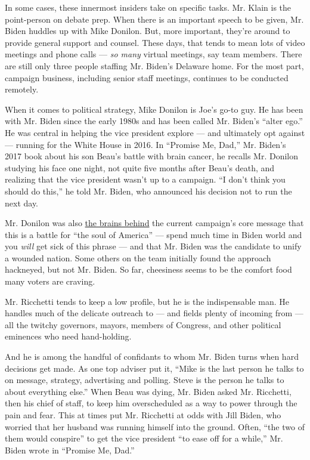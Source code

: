 In some cases, these innermost insiders take on specific tasks. Mr.
Klain is the point-person on debate prep. When there is an important
speech to be given, Mr. Biden huddles up with Mike Donilon. But, more
important, they're around to provide general support and counsel. These
days, that tends to mean lots of video meetings and phone calls ---
\emph{so many} virtual meetings, say team members. There are still only
three people staffing Mr. Biden's Delaware home. For the most part,
campaign business, including senior staff meetings, continues to be
conducted remotely.

When it comes to political strategy, Mike Donilon is Joe's go-to guy. He
has been with Mr. Biden since the early 1980s and has been called Mr.
Biden's ``alter ego.'' He was central in helping the vice president
explore --- and ultimately opt against --- running for the White House
in 2016. In ``Promise Me, Dad,'' Mr. Biden's 2017 book about his son
Beau's battle with brain cancer, he recalls Mr. Donilon studying his
face one night, not quite five months after Beau's death, and realizing
that the vice president wasn't up to a campaign. ``I don't think you
should do this,'' he told Mr. Biden, who announced his decision not to
run the next day.

Mr. Donilon was also
\href{https://www.politico.com/news/magazine/2019/12/19/biden-2020-campaign-president-advisers-087410}{the
brains behind} the current campaign's core message that this is a battle
for ``the soul of America'' --- spend much time in Biden world and you
\emph{will} get sick of this phrase --- and that Mr. Biden was the
candidate to unify a wounded nation. Some others on the team initially
found the approach hackneyed, but not Mr. Biden. So far, cheesiness
seems to be the comfort food many voters are craving.

Mr. Ricchetti tends to keep a low profile, but he is the indispensable
man. He handles much of the delicate outreach to --- and fields plenty
of incoming from --- all the twitchy governors, mayors, members of
Congress, and other political eminences who need hand-holding.

And he is among the handful of confidants to whom Mr. Biden turns when
hard decisions get made. As one top adviser put it, ``Mike is the last
person he talks to on message, strategy, advertising and polling. Steve
is the person he talks to about everything else.'' When Beau was dying,
Mr. Biden asked Mr. Ricchetti, then his chief of staff, to keep him
overscheduled as a way to power through the pain and fear. This at times
put Mr. Ricchetti at odds with Jill Biden, who worried that her husband
was running himself into the ground. Often, ``the two of them would
conspire'' to get the vice president ``to ease off for a while,'' Mr.
Biden wrote in ``Promise Me, Dad.''

